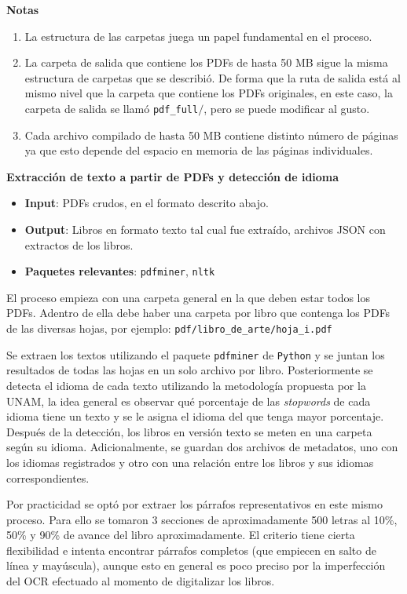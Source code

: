 \textbf{Notas}
\begin{enumerate}
\item La estructura de las carpetas juega un papel fundamental en el proceso.
\item La carpeta de salida que contiene los PDFs de hasta 50 MB sigue la misma estructura de carpetas que se describió. 
De forma que la ruta de salida está al mismo nivel que la carpeta que contiene los PDFs originales, en este caso, la carpeta de salida  se llamó \texttt{pdf\_full$/$}, pero se puede modificar al gusto.
\item Cada archivo compilado de hasta 50 MB contiene distinto número de páginas ya que esto depende del espacio en memoria de las páginas individuales. 
\end{enumerate}

\textbf{Extracción de texto
a partir de PDFs y detección de idioma}

\begin{itemize}
\item \textbf{Input}: PDFs crudos, en el formato descrito abajo.
\item \textbf{Output}: Libros en formato texto tal cual fue extraído, archivos JSON con extractos de los libros.
\item \textbf{Paquetes relevantes}: \texttt{pdfminer}, \texttt{nltk}
\end{itemize}




El proceso empieza con una carpeta general en la que deben estar todos los PDFs. Adentro de ella debe haber una carpeta por libro que contenga los PDFs de las diversas hojas, por ejemplo: \texttt{pdf/libro\_de\_arte/hoja\_i.pdf}

Se extraen los textos utilizando el paquete  \texttt{pdfminer} de \texttt{Python} y se juntan los resultados de todas las hojas en un solo archivo por libro. Posteriormente se detecta el idioma de cada texto utilizando la metodología propuesta por la UNAM, la idea general es observar qué porcentaje de las \emph{stopwords} de cada idioma tiene un texto y se le asigna el idioma del que tenga mayor porcentaje. Después de la detección, los libros en versión texto se meten en una carpeta según su idioma. Adicionalmente, se guardan dos archivos de metadatos, uno con los idiomas registrados y otro con una relación entre los libros y sus idiomas correspondientes.

Por practicidad se optó por extraer los párrafos representativos en este mismo proceso. Para ello se tomaron 3 secciones de aproximadamente 500 letras al 10\%, 50\% y 90\% de avance del libro aproximadamente. El criterio tiene cierta flexibilidad e intenta encontrar párrafos completos (que empiecen en salto de línea y mayúscula), aunque esto en general es poco preciso por la imperfección del OCR efectuado al momento de digitalizar los libros.

